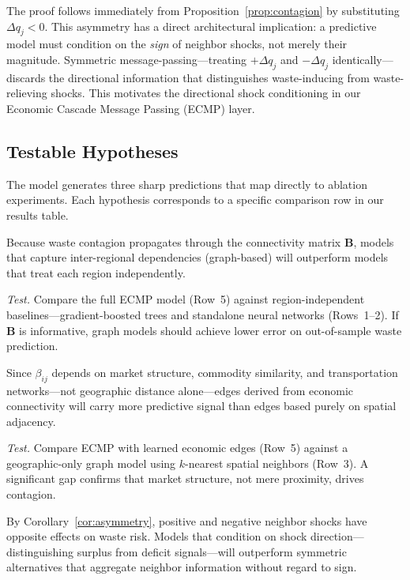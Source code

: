 The proof follows immediately from Proposition~\ref{prop:contagion} by substituting $\Delta q_j < 0$.
This asymmetry has a direct architectural implication: a predictive model must condition on the \emph{sign} of neighbor shocks, not merely their magnitude.
Symmetric message-passing---treating $+\Delta q_j$ and $-\Delta q_j$ identically---discards the directional information that distinguishes waste-inducing from waste-relieving shocks.
This motivates the directional shock conditioning in our Economic Cascade Message Passing (ECMP) layer.

\subsection{Testable Hypotheses}
\label{sec:hypotheses}

The model generates three sharp predictions that map directly to ablation experiments.
Each hypothesis corresponds to a specific comparison row in our results table.

\begin{hypothesis}
\label{hyp:graph}
Because waste contagion propagates through the connectivity matrix $\mathbf{B}$, models that capture inter-regional dependencies (graph-based) will outperform models that treat each region independently.
\end{hypothesis}

\noindent\textit{Test.}\; Compare the full ECMP model (Row~5) against region-independent baselines---gradient-boosted trees and standalone neural networks (Rows~1--2).
If $\mathbf{B}$ is informative, graph models should achieve lower error on out-of-sample waste prediction.

\begin{hypothesis}
\label{hyp:edges}
Since $\beta_{ij}$ depends on market structure, commodity similarity, and transportation networks---not geographic distance alone---edges derived from economic connectivity will carry more predictive signal than edges based purely on spatial adjacency.
\end{hypothesis}

\noindent\textit{Test.}\; Compare ECMP with learned economic edges (Row~5) against a geographic-only graph model using $k$-nearest spatial neighbors (Row~3).
A significant gap confirms that market structure, not mere proximity, drives contagion.

\begin{hypothesis}
\label{hyp:asymmetry}
By Corollary~\ref{cor:asymmetry}, positive and negative neighbor shocks have opposite effects on waste risk.
Models that condition on shock direction---distinguishing surplus from deficit signals---will outperform symmetric alternatives that aggregate neighbor information without regard to sign.
\end{hypothesis}

